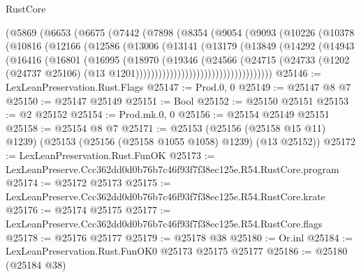 \begin{lexlean}{RustCore}
\begin{coremodule}
                  (@5869
                    (@6653
                      (@6675
                        (@7442
                          (@7898
                            (@8354
                              (@9054
                                (@9093
                                  (@10226
                                    (@10378
                                      (@10816
                                        (@12166
                                          (@12586
                                            (@13006
                                              (@13141
                                                (@13179
                                                  (@13849
                                                    (@14292
                                                      (@14943
                                                        (@16416
                                                          (@16801
                                                            (@16995
                                                              (@18970
                                                                (@19346
                                                                  (@24566
                                                                    (@24715
                                                                      (@24733
                                                                        (@1202
                                                                          (@24737 @25106)
                                                                          (@13
                                                                            @1201))))))))))))))))))))))))))))))))))))
@25146 := LexLeanPreservation.Rust.Flags
@25147 := Prod.{0, 0}
@25149 := @25147 @8 @7
@25150 := @25147 @25149
@25151 := Bool
@25152 := @25150 @25151
@25153 := @2 @25152
@25154 := Prod.mk.{0, 0}
@25156 := @25154 @25149 @25151
@25158 := @25154 @8 @7
@25171 := @25153
    (@25156 (@25158 @15 @11) @1239)
    (@25153 (@25156 (@25158 @1055 @1058) @1239) (@13 @25152))
@25172 := LexLeanPreservation.Rust.FunOK
@25173 := LexLeanPreserve.Ccc362dd0d0b76b7c46f93f7f38ec125e.R54.RustCore.program
@25174 := @25172 @25173
@25175 := LexLeanPreserve.Ccc362dd0d0b76b7c46f93f7f38ec125e.R54.RustCore.krate
@25176 := @25174 @25175
@25177 := LexLeanPreserve.Ccc362dd0d0b76b7c46f93f7f38ec125e.R54.RustCore.flags
@25178 := @25176 @25177
@25179 := @25178 @38
@25180 := Or.inl
@25184 := LexLeanPreservation.Rust.FunOK0 @25173 @25175 @25177
@25186 := @25180 (@25184 @38)

\end{coremodule}
\end{lexlean}
